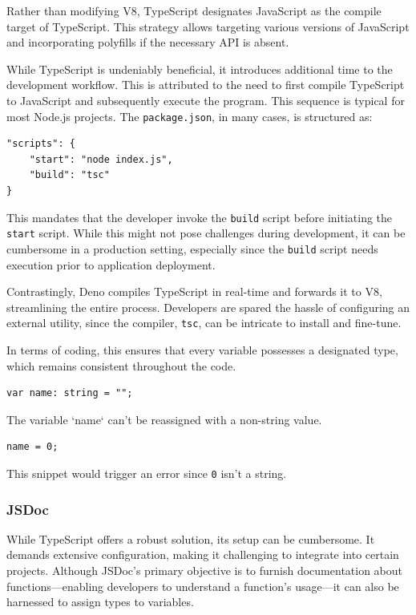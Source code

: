 \documentclass[10pt,journal,compsoc]{IEEEtran}
\begin{document}
Rather than modifying V8, TypeScript designates JavaScript as the compile target of TypeScript. This strategy allows targeting various versions of JavaScript and incorporating polyfills \cite{Polyfill} if the necessary API is absent.

While TypeScript is undeniably beneficial, it introduces additional time to the development workflow. This is attributed to the need to first compile TypeScript to JavaScript and subsequently execute the program. This sequence is typical for most Node.js projects. The \verb|package.json|, in many cases, is structured as:

\begin{lstlisting}
"scripts": {
    "start": "node index.js",
    "build": "tsc"
}
\end{lstlisting}

This mandates that the developer invoke the \verb|build| script before initiating the \verb|start| script. While this might not pose challenges during development, it can be cumbersome in a production setting, especially since the \verb|build| script needs execution prior to application deployment.

Contrastingly, Deno compiles TypeScript in real-time and forwards it to V8, streamlining the entire process. Developers are spared the hassle of configuring an external utility, since the compiler, \verb|tsc|, can be intricate to install and fine-tune.

In terms of coding, this ensures that every variable possesses a designated type, which remains consistent throughout the code.

\begin{lstlisting}
var name: string = "";
\end{lstlisting}

The variable `name` can't be reassigned with a non-string value.

\begin{lstlisting}
name = 0;
\end{lstlisting}

This snippet would trigger an error since \verb|0| isn't a string.

\subsubsection{JSDoc}

While TypeScript offers a robust solution, its setup can be cumbersome. It demands extensive configuration, making it challenging to integrate into certain projects. Although JSDoc's primary objective is to furnish documentation about functions—enabling developers to understand a function's usage—it can also be harnessed to assign types to variables.
\end{document}
